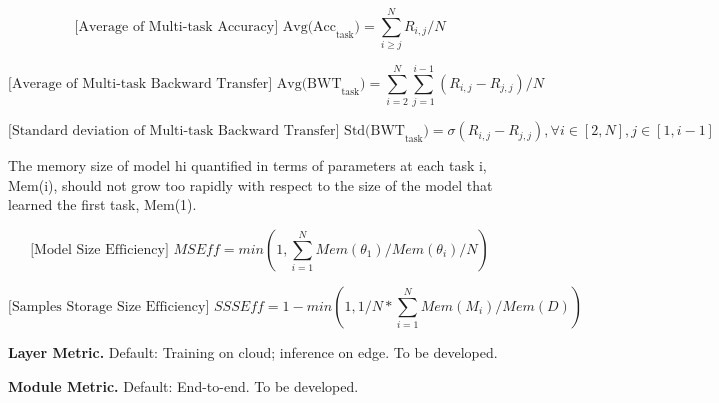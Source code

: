 \begin{equation} \label{equ:aoma} 
\text{[Average of Multi-task Accuracy] }
\text{Avg(Acc}_\text{task}) = \sum^N_{i \geq j} R_{i,j} / N
\end{equation}



\begin{equation} \label{equ:aombt} 
\text{[Average of Multi-task Backward Transfer] }
\text{Avg(BWT}_\text{task}) = \sum^{N}_{i=2}\sum^{i-1}_{j=1}(R_{i,j}-R_{j,j}) / N
\end{equation}



\begin{equation} \label{equ:aombt} 
\text{[Standard deviation of Multi-task Backward Transfer] }
\text{Std(BWT}_\text{task}) = \sigma(R_{i,j}-R_{j,j}), \forall i \in [2, N], j \in [1, i-1]
\end{equation}

The memory size of model hi quantified in terms of parameters at each task
i, Mem(i), should not grow too rapidly with respect to the size of the model that learned the first task, Mem(1).

\begin{equation} \label{equ:mseff} 
\text{[Model Size Efficiency] }
MSEff = min(1, \sum_{i=1}^N Mem(\theta_1) / Mem(\theta_i) / N)
\end{equation}

\begin{equation} \label{equ:ssse} 
\text{[Samples Storage Size Efficiency] }
SSSEff = 1 - min(1, 1/N * \sum_{i=1}^N Mem(M_i) / Mem(D))
\end{equation}

\textbf{Layer Metric.} Default: Training on cloud; inference on edge. To be developed. 

\textbf{Module Metric.} Default: End-to-end. To be developed.  

